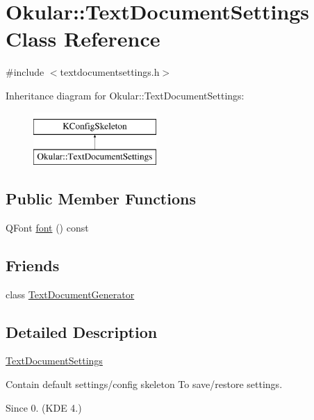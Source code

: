 \hypertarget{classOkular_1_1TextDocumentSettings}{\section{Okular\+:\+:Text\+Document\+Settings Class Reference}
\label{classOkular_1_1TextDocumentSettings}
}


{\ttfamily \#include $<$textdocumentsettings.\+h$>$}

Inheritance diagram for Okular\+:\+:Text\+Document\+Settings\+:\begin{figure}[H]
\begin{center}
\leavevmode
\includegraphics[height=2.000000cm]{classOkular_1_1TextDocumentSettings}
\end{center}
\end{figure}
\subsection*{Public Member Functions}
\begin{DoxyCompactItemize}
\item 
Q\+Font \hyperlink{classOkular_1_1TextDocumentSettings_abcd230ba0c0c7cd0f9b88c91197c7df0}{font} () const 
\end{DoxyCompactItemize}
\subsection*{Friends}
\begin{DoxyCompactItemize}
\item 
class \hyperlink{classOkular_1_1TextDocumentSettings_a0a259fd10df5d599787dfbe154563772}{Text\+Document\+Generator}
\end{DoxyCompactItemize}


\subsection{Detailed Description}
\hyperlink{classOkular_1_1TextDocumentSettings}{Text\+Document\+Settings}

Contain default settings/config skeleton To save/restore settings.

\begin{DoxySince}{Since}
0. (K\+D\+E 4.) 
\end{DoxySince}


